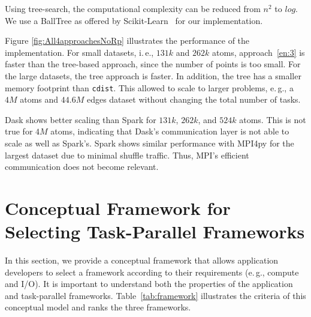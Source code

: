 Using tree-search, the computational complexity can be reduced from $n^2$ to $log$. 
We use a BallTree as offered by Scikit-Learn~\cite{scikit-nearest} for our implementation.

Figure \ref{fig:All4approachesNoRp} illustrates the performance of the implementation.
For small datasets, i.\,e., $131k$ and $262k$ atoms, approach~\ref{en:3} is faster than the tree-based approach, since the number of points is too small.
For the large datasets, the tree approach is faster.
In addition, the tree has a smaller memory footprint than \texttt{cdist}.
This allowed to scale to larger problems, e.\,g., a $4M$ atoms and $44.6M$ edges dataset without changing the total number of tasks.

Dask shows better scaling than Spark for $131k$, $262k$, and $524k$ atoms.
This is not true for $4M$ atoms, indicating that Dask's communication layer is not able to scale as well as Spark's.
Spark shows similar performance with MPI4py for the largest dataset due to minimal shuffle traffic.
Thus, MPI's efficient communication does not become relevant.

\section{Conceptual Framework for Selecting Task-Parallel Frameworks}
\label{sec:task_sel_model}
In this section, we provide a conceptual framework that allows application developers to select a framework according to their requirements (e.\,g., compute and I/O).
It is important to understand both the properties of the application and task-parallel frameworks.
Table~\ref{tab:framework} illustrates the criteria of this conceptual model and ranks the three frameworks.

